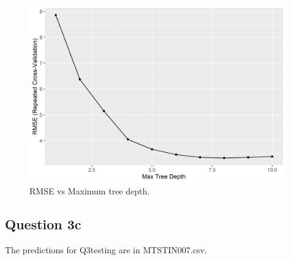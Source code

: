 \documentclass[
]{article}
\begin{document}
\begin{figure}
\centering
\includegraphics[width=4.36458in,height=\textheight]{rmse_xgboost.png}
\caption{RMSE vs Maximum tree depth.}
\end{figure}

\hypertarget{question-3c}{%
\subsection{Question 3c}\label{question-3c}}

The predictions for Q3testing are in MTSTIN007.csv.
\end{document}
